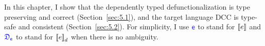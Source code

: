 
In this chapter, I show that the dependently typed defunctionalization is type preserving and correct (Section~\ref{sec:5.1}), and the target language DCC is type-safe and consistent (Section~\ref{sec:5.2}). For simplicity, I use $\target{e}$ to stand for ${[\![ e ]\!]}$ and $\target{\fdef_e}$ to stand for ${[\![ e ]\!]}_d$ when there is no ambiguity.






